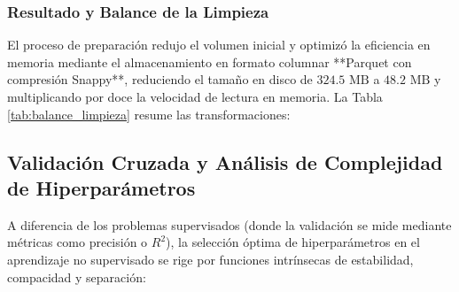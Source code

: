 \subsubsection{Resultado y Balance de la Limpieza}

El proceso de preparación redujo el volumen inicial y optimizó la eficiencia en memoria mediante el almacenamiento en formato columnar **Parquet con compresión Snappy**, reduciendo el tamaño en disco de $324.5\text{ MB}$ a $48.2\text{ MB}$ y multiplicando por doce la velocidad de lectura en memoria. La Tabla \ref{tab:balance_limpieza} resume las transformaciones:

\begin{table}[htbp]
\centering
\small
{}
\caption{Resumen del balance del pipeline de depuración y preparación de datos.}
\label{tab:balance_limpieza}
\end{table}

\subsection{Validación Cruzada y Análisis de Complejidad de Hiperparámetros}

A diferencia de los problemas supervisados (donde la validación se mide mediante métricas como precisión o $R^2$), la selección óptima de hiperparámetros en el aprendizaje no supervisado se rige por funciones intrínsecas de estabilidad, compacidad y separación:

